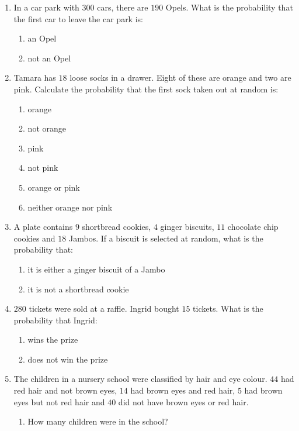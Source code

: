 \begin{eocexercises}{}
\begin{enumerate}[itemsep=5pt, label=\textbf{\arabic*}. ]
  \item In a car park with $300$ cars, there are $190$ Opels. What is the
    probability that the first car to leave the car park is:
    \begin{enumerate}[noitemsep, label=\textbf{(\alph*)} ]
    \item an Opel
    \item not an Opel
    \end{enumerate}
  \item Tamara has $18$ loose socks in a drawer. Eight of these are
    orange and two are pink. Calculate the probability that the first
    sock taken out at random is:
    \begin{enumerate}[noitemsep, label=\textbf{(\alph*)} ]
    \item orange
    \item not orange
    \item pink
    \item not pink
    \item orange or pink
    \item neither orange nor pink
    \end{enumerate}
  \item A plate contains $9$ shortbread cookies, $4$ ginger biscuits,
    $11$ chocolate chip cookies and $18$ Jambos. If a biscuit is
    selected at random, what is the probability that:
    \begin{enumerate}[noitemsep, label=\textbf{(\alph*)} ]
    \item it is either a ginger biscuit of a Jambo
    \item it is not a shortbread cookie
    \end{enumerate}
  \item $280$ tickets were sold at a raffle. Ingrid bought $15$
    tickets. What is the probability that Ingrid:
    \begin{enumerate}[noitemsep, label=\textbf{(\alph*)} ]
    \item wins the prize
    \item does not win the prize
    \end{enumerate}
  \item The children in a nursery school were classified by hair and
    eye colour. $44$ had red hair and not brown eyes, $14$ had brown eyes
    and red hair, $5$ had brown eyes but not red hair and $40$ did not
    have brown eyes or red hair.
    \begin{enumerate}[noitemsep, label=\textbf{(\alph*)} ]
    \item How many children were in the school?

\end{enumerate}
\end{enumerate}
\end{eocexercises}
